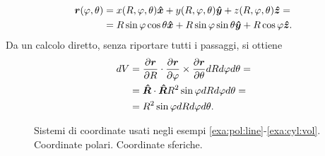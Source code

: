 \begin{remark}
\begin{example}
\begin{equation}
\begin{aligned}
 \bm{r}(\varphi,\theta) & = 
 x(R,\varphi,\theta) \bm{\hat{x}} + y(R,\varphi,\theta) \bm{\hat{y}} + z(R,\varphi,\theta) \bm{\hat{z}} = \\
& = R \sin \varphi \cos \theta \bm{\hat{x}} +
    R \sin \varphi \sin \theta \bm{\hat{y}} +
    R \cos \varphi \bm{\hat{z}} .
\end{aligned}
\end{equation}
Da un calcolo diretto, senza riportare tutti i passaggi, si ottiene
\begin{equation}
\begin{aligned}
 dV & = \dfrac{\partial \bm{r}}{\partial R} \cdot \dfrac{\partial \bm{r}}{\partial \varphi} \times \dfrac{\partial \bm{r}}{\partial \theta} dR d\varphi d\theta = \\
  & = \bm{\hat{R}} \cdot \bm{\hat{R}} R^2 \sin \varphi dR d \varphi d \theta = \\
  & = R^2 \sin \varphi dR d \varphi d \theta .
\end{aligned}
\end{equation}
\end{example}

\begin{figure}[h]
\centering
 \quad
{}
\caption{Sistemi di coordinate usati negli esempi \ref{exa:pol:line}-\ref{exa:cyl:vol}. \protect{} Coordinate polari. \protect{} Coordinate sferiche.}\label{fig:elementary} 
\end{figure}

\end{remark} 

